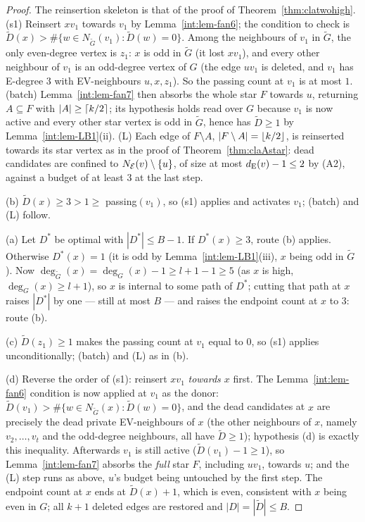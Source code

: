 \begin{proof}
The reinsertion skeleton is that of the proof of
Theorem~\ref{thm:clatwohigh}. (s1) Reinsert $xv_1$ towards $v_1$ by
Lemma~\ref{int:lem-fan6}; the condition to check is
$\tilde D(x)>\#\{w\in N_{\tilde G}(v_1):\tilde D(w)=0\}$. Among the
neighbours of $v_1$ in $\tilde G$, the only even-degree vertex is $z_1$:
$x$ is odd in $\tilde G$ (it lost $xv_1$), and every other neighbour of
$v_1$ is an odd-degree vertex of $G$ (the edge $uv_1$ is deleted, and
$v_1$ has E-degree $3$ with EV-neighbours $u,x,z_1$). So the passing
count at $v_1$ is at most $1$. (batch) Lemma~\ref{int:lem-fan7} then
absorbs the whole star $F$ towards $u$, returning $A\subseteq F$ with
$|A|\ge\left\lceil k/2 \right\rceil$; its hypothesis holds read over $G$ because $v_1$ is
now active and every other star vertex is odd in $\tilde G$, hence has
$\tilde D\ge1$ by Lemma~\ref{int:lem-LB1}(ii). (L) Each edge of
$F\setminus A$, $|F\setminus A|=\left\lfloor k/2 \right\rfloor$, is reinserted towards its
star vertex as in the proof of Theorem~\ref{thm:claAstar}: dead
candidates are confined to $N_{\mathcal{E}}(v)\setminus\{u\}$, of size at most
$d_{\mathrm{E}}(v)-1\le2$ by (A2), against a budget of at least $3$ at the last
step.

(b) $\tilde D(x)\ge3>1\ge$ passing$(v_1)$, so (s1) applies and activates
$v_1$; (batch) and (L) follow.

(a) Let $D^*$ be optimal with $|D^*|\le B-1$. If $D^*(x)\ge3$, route (b)
applies. Otherwise $D^*(x)=1$ (it is odd by Lemma~\ref{int:lem-LB1}(iii),
$x$ being odd in $\tilde G$). Now
$\deg_{\tilde G}(x)=\deg_G(x)-1\ge l+1-1\ge5$ (as $x$ is high,
$\deg_G(x)\ge l+1$), so $x$ is internal to some path of $D^*$; cutting
that path at $x$ raises $|D^*|$ by one --- still at most $B$ --- and
raises the endpoint count at $x$ to $3$: route (b).

(c) $\tilde D(z_1)\ge1$ makes the passing count at $v_1$ equal to $0$, so
(s1) applies unconditionally; (batch) and (L) as in (b).

(d) Reverse the order of (s1): reinsert $xv_1$ \emph{towards $x$} first.
The Lemma~\ref{int:lem-fan6} condition is now applied at $v_1$ as the
donor: $\tilde D(v_1)>\#\{w\in N_{\tilde G}(x):\tilde D(w)=0\}$, and the
dead candidates at $x$ are precisely the dead private EV-neighbours of
$x$ (the other neighbours of $x$, namely $v_2,\dots,v_t$ and the
odd-degree neighbours, all have $\tilde D\ge1$); hypothesis (d) is
exactly this inequality. Afterwards $v_1$ is still active
($\tilde D(v_1)-1\ge1$), so Lemma~\ref{int:lem-fan7} absorbs the
\emph{full} star $F$, including $uv_1$, towards $u$; and the (L) step
runs as above, $u$'s budget being untouched by the first step. The
endpoint count at $x$ ends at $\tilde D(x)+1$, which is even, consistent
with $x$ being even in $G$; all $k+1$ deleted edges are restored and
$|D|=|\tilde D|\le B$.


\end{proof}
